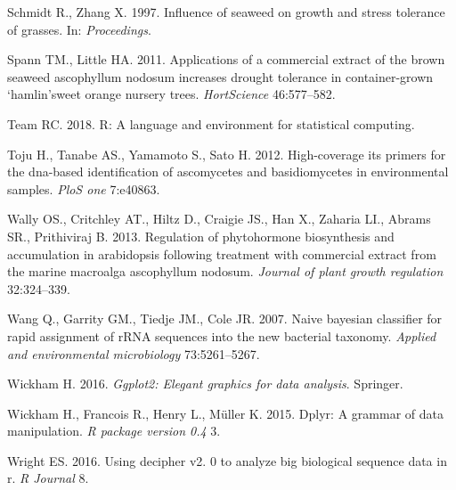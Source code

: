 \documentclass[11pt,]{article}
\begin{document}
\hypertarget{ref-schmidt1997influence}{}
Schmidt R., Zhang X. 1997. Influence of seaweed on growth and stress
tolerance of grasses. In: \emph{Proceedings}.

\hypertarget{ref-spann2011applications}{}
Spann TM., Little HA. 2011. Applications of a commercial extract of the
brown seaweed ascophyllum nodosum increases drought tolerance in
container-grown `hamlin'sweet orange nursery trees. \emph{HortScience}
46:577--582.

\hypertarget{ref-team2018r}{}
Team RC. 2018. R: A language and environment for statistical computing.

\hypertarget{ref-toju2012high}{}
Toju H., Tanabe AS., Yamamoto S., Sato H. 2012. High-coverage its
primers for the dna-based identification of ascomycetes and
basidiomycetes in environmental samples. \emph{PloS one} 7:e40863.

\hypertarget{ref-wally2013regulation}{}
Wally OS., Critchley AT., Hiltz D., Craigie JS., Han X., Zaharia LI.,
Abrams SR., Prithiviraj B. 2013. Regulation of phytohormone biosynthesis
and accumulation in arabidopsis following treatment with commercial
extract from the marine macroalga ascophyllum nodosum. \emph{Journal of
plant growth regulation} 32:324--339.

\hypertarget{ref-wang2007naive}{}
Wang Q., Garrity GM., Tiedje JM., Cole JR. 2007. Naive bayesian
classifier for rapid assignment of rRNA sequences into the new bacterial
taxonomy. \emph{Applied and environmental microbiology} 73:5261--5267.

\hypertarget{ref-wickham2016ggplot2}{}
Wickham H. 2016. \emph{Ggplot2: Elegant graphics for data analysis}.
Springer.

\hypertarget{ref-wickham2015dplyr}{}
Wickham H., Francois R., Henry L., Müller K. 2015. Dplyr: A grammar of
data manipulation. \emph{R package version 0.4} 3.

\hypertarget{ref-wright2016using}{}
Wright ES. 2016. Using decipher v2. 0 to analyze big biological sequence
data in r. \emph{R Journal} 8.




\newpage
\singlespacing 
\end{document}
